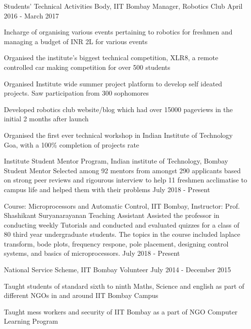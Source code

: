

\begin{cventries}
	\cventry
		{Students' Technical Activities Body, IIT Bombay}
		{Manager, Robotics Club}
		{}
		{April 2016 - March 2017}
		{
		\begin{cvitems}
			\item Incharge of organising various events pertaining to robotics for freshmen and managing a budget of INR 2L for various events 
			\item Organised the institute's biggest technical competition, XLR8, a remote controlled car making competition for over 500 students
			\item Organised Institute wide summer project platform to develop self ideated projects. Saw participation from 300 sophomores
			\item Developed robotics club website/blog which had over 15000 pageviews in the initial 2 months after launch
			\item Organised the first ever technical workshop in Indian Institute of Technology Goa, with a 100\% completion of projects rate
		\end{cvitems}
		}

	\cventry
		{Institute Student Mentor Program, Indian institute of Technology, Bombay}
		{Student Mentor}
		{Selected among 92 mentors from amongst 290 applicants based on strong peer reviews and rigourous interview to help 11 freshmen acclimatise to campus life and helped them with their problems}
		{July 2018 - Present}
		{}

	\cventry
		{Course: Microprocessors and Automatic Control, IIT Bombay, Instructor: Prof. Shashikant Suryanarayanan}
		{Teaching Assistant}
		{Assisted the professor in conducting weekly Tutorials and conducted and evaluated quizzes for a class of 80 third year undergraduate students. The topics in the course included laplace transform, bode plots, frequency respone, pole placement, designing control systems, and basics of microprocessors.}
		{July 2018 - Present}
		{}

	\cventry
		{National Service Scheme, IIT Bombay} %
		{Volunteer} %
		{} %
		{July 2014 - December 2015} %
		{
		  \begin{cvitems} %
		    \item Taught students of standard sixth to ninth Maths, Science and english as part of different NGOs in and around IIT Bombay Campus
		    \item Taught mess workers and security of IIT Bombay as a part of NGO Computer Learning Program
		  \end{cvitems}
		}
		
\end{cventries}